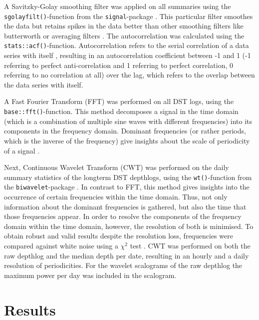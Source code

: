 \documentclass[
  authoryear,
  review,
  3p]{elsarticle}
\begin{document}
A Savitzky-Golay smoothing filter \citep[ filter order \emph{p = 1},
filter length \emph{n = 5}]{press_1990} was applied on all summaries
using the \texttt{sgolayfilt()}-function from the
\texttt{signal}-package \citep{signal}. This particular filter smoothes
the data but retains spikes in the data better than other smoothing
filters like butterworth or averaging filters \citep[like rolling
mean,][]{schafer_2011}. The autocorrelation was calculated using the
\texttt{stats::acf()}-function. Autocorrelation refers to the serial
correlation of a data series with itself \citep{bartlett_1946},
resulting in an autocorrelation coefficient between -1 and 1 (-1
referring to perfect anti-correlation and 1 referring to perfect
correlation, 0 referring to no correlation at all) over the lag, which
refers to the overlap between the data series with itself.

A Fast Fourier Transform (FFT) was performed on all DST logs, using the
\texttt{base::fft()}-function. This method decomposes a signal in the
time domain (which is a combination of multiple sine waves with
different frequencies) into its components in the frequency domain.
Dominant frequencies (or rather periods, which is the inverse of the
frequency) give insights about the scale of periodicity of a signal
\citep[in the present case the signal is the depth-timeseries of the
sharks,][]{cochran_1967}.

Next, Continuous Wavelet Transform (CWT) was performed on the daily
summary statistics of the longterm DST depthlogs, using the
\texttt{wt()}-function from the \texttt{biwavelet}-package
\citep{biwavelet}. In contrast to FFT, this method gives insights into
the occurrence of certain frequencies within the time domain. Thus, not
only information about the dominant frequencies is gathered, but also
the time that those frequencies appear. In order to resolve the
components of the frequency domain within the time domain, however, the
resolution of both is minimised. To obtain robust and valid results
despite the resolution loss, frequencies were compared against white
noise using a \(\chi^2\) test \citep{grinsted_2004}. CWT was performed
on both the raw depthlog and the median depth per date, resulting in an
hourly and a daily resolution of periodicities. For the wavelet
scalograms of the raw depthlog the maximum power per day was included in
the scalogram.

\hypertarget{sec-results}{%
\section{Results}\label{sec-results}}
\end{document}
